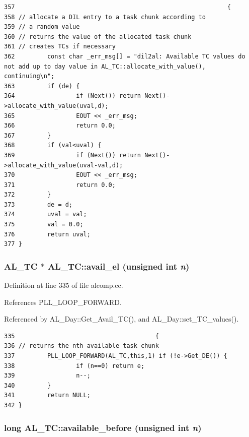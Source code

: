 \footnotesize\begin{verbatim}357                                                           {
358 // allocate a DIL entry to a task chunk according to
359 // a random value
360 // returns the value of the allocated task chunk
361 // creates TCs if necessary
362         const char _err_msg[] = "dil2al: Available TC values do not add up to day value in AL_TC::allocate_with_value(), continuing\n";
363         if (de) {
364                 if (Next()) return Next()->allocate_with_value(uval,d);
365                 EOUT << _err_msg;
366                 return 0.0;
367         }
368         if (val<uval) {
369                 if (Next()) return Next()->allocate_with_value(uval-val,d);
370                 EOUT << _err_msg;
371                 return 0.0;
372         }
373         de = d;
374         uval = val;
375         val = 0.0;
376         return uval;
377 }
\end{verbatim}\normalsize 
{}
\subsubsection{\setlength{\rightskip}{0pt plus 5cm}AL\_\-TC $\ast$ AL\_\-TC::avail\_\-el (unsigned int {\em n})}\label{classAL__TC_a4}




Definition at line 335 of file alcomp.cc.

References PLL\_\-LOOP\_\-FORWARD.

Referenced by AL\_\-Day::Get\_\-Avail\_\-TC(), and AL\_\-Day::set\_\-TC\_\-values().



\footnotesize\begin{verbatim}335                                       {
336 // returns the nth available task chunk
337         PLL_LOOP_FORWARD(AL_TC,this,1) if (!e->Get_DE()) {
338                 if (n==0) return e;
339                 n--;
340         }
341         return NULL;
342 }
\end{verbatim}\normalsize 
{}
\subsubsection{\setlength{\rightskip}{0pt plus 5cm}long AL\_\-TC::available\_\-before (unsigned int {\em n})}\label{classAL__TC_a8}




